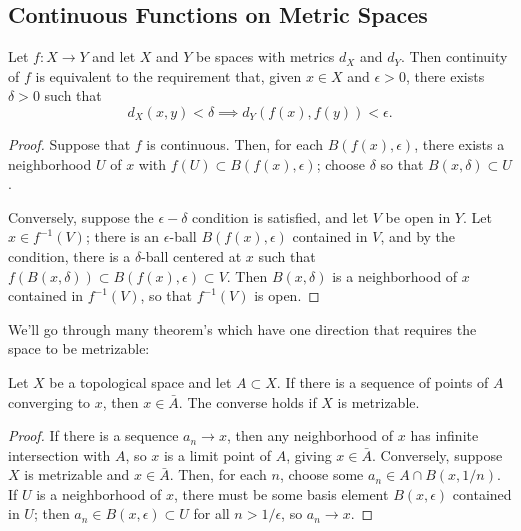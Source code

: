 \documentclass[10pt]{report}
\begin{document}
\subsection{Continuous Functions on Metric Spaces}
\begin{theorem}
  Let $f:X \rightarrow Y$ and let $X$ and $Y$ be spaces with metrics $d_X$ and $d_Y$.
  Then continuity of $f$ is equivalent to the requirement that, given $x \in X$ and $\epsilon > 0$, there exists $\delta > 0$ such that
\[ d_X(x,y) < \delta \implies d_Y(f(x),f(y)) < \epsilon.\]
\end{theorem}
\begin{proof}
  Suppose that $f$ is continuous.
  Then, for each $B(f(x),\epsilon)$, there exists a neighborhood $U$ of $x$ with $f(U) \subset B(f(x),\epsilon)$;
  choose $\delta$ so that $B(x,\delta) \subset U$.

  Conversely, suppose the $\epsilon-\delta$ condition is satisfied, and let $V$ be open in $Y$.
  Let $x \in f^{-1}(V)$;
  there is an $\epsilon$-ball $B(f(x),\epsilon)$ contained in $V$, and by the condition, there is a $\delta$-ball centered at $x$ such that $f(B(x,\delta)) \subset B(f(x),\epsilon) \subset V$.
  Then $B(x,\delta)$ is a neighborhood of $x$ contained in $f^{-1}(V)$, so that $f^{-1}(V)$ is open.
\end{proof}

We'll go through many theorem's which have one direction that requires the space to be metrizable:

\begin{lemma}
  Let $X$ be a topological space and let $A \subset X$.
  If there is a sequence of points of $A$ converging to $x$, then $x \in \bar A$.
  The converse holds if $X$ is metrizable.
\end{lemma}
\begin{proof}
  If there is a sequence $a_n \rightarrow x$, then any neighborhood of $x$ has infinite intersection with $A$, so $x$ is a limit point of $A$, giving $x \in \bar A$.
  Conversely, suppose $X$ is metrizable and $x \in \bar A$.
  Then, for each $n$, choose some $a_n \in A \cap B(x,1/n)$.
  If $U$ is a neighborhood of $x$, there must be some basis element $B(x,\epsilon)$ contained in $U$; then $a_n \in B(x,\epsilon) \subset U$ for all $n > 1/\epsilon$, so $a_n \rightarrow x$.
\end{proof}
\end{document}
